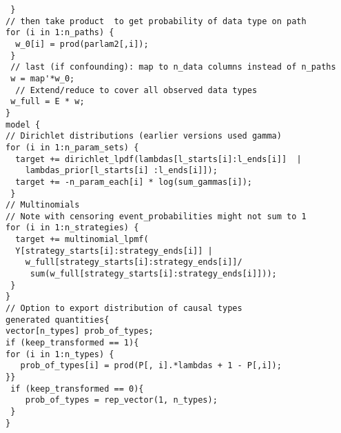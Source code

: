 \documentclass[
  11pt,
  article]{jss}
\begin{document}
\begin{verbatim}
 }
// then take product  to get probability of data type on path
for (i in 1:n_paths) {
  w_0[i] = prod(parlam2[,i]);
 }
 // last (if confounding): map to n_data columns instead of n_paths
 w = map'*w_0;
  // Extend/reduce to cover all observed data types
 w_full = E * w;
}
model {
// Dirichlet distributions (earlier versions used gamma)
for (i in 1:n_param_sets) {
  target += dirichlet_lpdf(lambdas[l_starts[i]:l_ends[i]]  |
    lambdas_prior[l_starts[i] :l_ends[i]]);
  target += -n_param_each[i] * log(sum_gammas[i]);
 }
// Multinomials
// Note with censoring event_probabilities might not sum to 1
for (i in 1:n_strategies) {
  target += multinomial_lpmf(
  Y[strategy_starts[i]:strategy_ends[i]] |
    w_full[strategy_starts[i]:strategy_ends[i]]/
     sum(w_full[strategy_starts[i]:strategy_ends[i]]));
 }
}
// Option to export distribution of causal types
generated quantities{
vector[n_types] prob_of_types;
if (keep_transformed == 1){
for (i in 1:n_types) {
   prob_of_types[i] = prod(P[, i].*lambdas + 1 - P[,i]);
}}
 if (keep_transformed == 0){
    prob_of_types = rep_vector(1, n_types);
 }
}
\end{verbatim}
\end{document}
